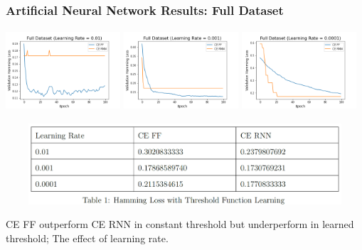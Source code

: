 \documentclass{beamer}
\begin{document}
\begin{frame}[t]
\frametitle{Artificial Neural Network Results: Full Dataset}
\begin{center}

\includegraphics[width=0.32\textwidth,height=3cm]{Images/Full_Dataset_Learning_Rate_01.png}
\includegraphics[width=0.32\textwidth,height=3cm]{Images/Full_Dataset_Learning_Rate_001.png}
\includegraphics[width=0.32\textwidth,height=3cm]{Images/Full_Dataset_Learning_Rate_0001.png}        
\end{center}

\begin{center}

\includegraphics[width=1\textwidth,height=3cm]{Images/Threshold learning for full dataset.png}
\end{center}

CE FF outperform CE RNN in constant threshold but underperform in learned threshold; The effect of learning rate. 
\end{frame}
\end{document}
